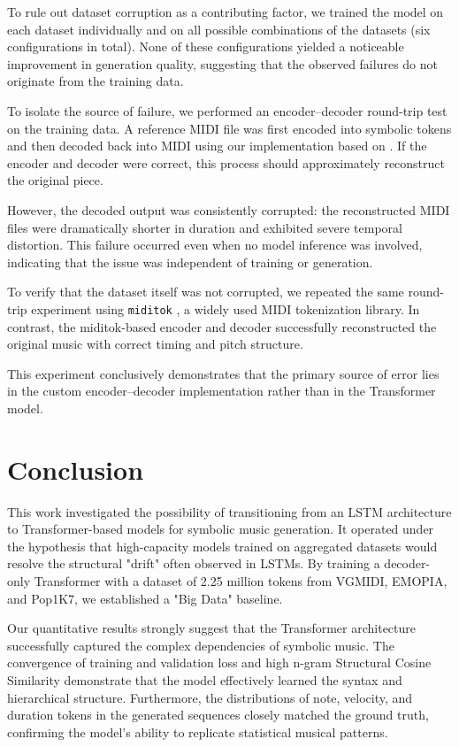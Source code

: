 \documentclass{article}
\begin{document}
To rule out dataset corruption as a contributing factor, we trained the model on each dataset individually and on all possible combinations of the datasets (six configurations in total).
None of these configurations yielded a noticeable improvement in generation quality, suggesting that the observed failures do not originate from the training data.

To isolate the source of failure, we performed an encoder–decoder round-trip test on the training data.
A reference MIDI file was first encoded into symbolic tokens and then decoded back into MIDI using our implementation based on \cite{vgmidi}.
If the encoder and decoder were correct, this process should approximately reconstruct the original piece.

However, the decoded output was consistently corrupted: the reconstructed MIDI files were dramatically shorter in duration and exhibited severe temporal distortion.
This failure occurred even when no model inference was involved, indicating that the issue was independent of training or generation.

To verify that the dataset itself was not corrupted, we repeated the same round-trip experiment using \texttt{miditok} \cite{miditok}, a widely used MIDI tokenization library.
In contrast, the miditok-based encoder and decoder successfully reconstructed the original music with correct timing and pitch structure.

This experiment conclusively demonstrates that the primary source of error lies in the custom encoder–decoder implementation rather than in the Transformer model.

\section{Conclusion}
This work investigated the possibility of transitioning from an LSTM architecture to Transformer-based models for symbolic music generation. It operated under the hypothesis that high-capacity models trained on aggregated datasets would resolve the structural "drift" often observed in LSTMs. By training a decoder-only Transformer with a dataset of 2.25 million tokens from VGMIDI, EMOPIA, and Pop1K7, we established a "Big Data" baseline.

Our quantitative results strongly suggest that the Transformer architecture successfully captured the complex dependencies of symbolic music. The convergence of training and validation loss and high n-gram Structural Cosine Similarity demonstrate that the model effectively learned the syntax and hierarchical structure. Furthermore, the distributions of note, velocity, and duration tokens in the generated sequences closely matched the ground truth, confirming the model's ability to replicate statistical musical patterns.
\end{document}
